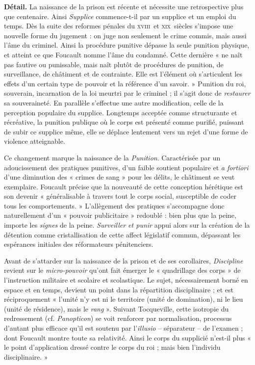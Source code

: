 \documentclass[11pt]{amsart}
\begin{document}
\textbf{Détail.} La naissance de la prison est récente et nécessite une retrospective plus que centenaire. Ainsi \textsl{Supplice} commence-t-il par un supplice et un emploi du temps. Dès la suite des reformes pénales du \textsc{xviii}\ieme \ et \textsc{xix}\ieme \ siècles s'impose une nouvelle forme du jugement : on juge non seulement le crime commis, mais aussi l'âme du criminel. Ainsi la procédure punitive dépasse la seule punition physique, et atteint ce que Foucault nomme l'âme du condamné. Cette dernière « ne naît pas fautive ou punissable, mais naît plutôt de procédures de punition, de surveillance, de châtiment et de contrainte. Elle est l'élément où s'articulent les effets d'un certain type de pouvoir et la référence d'un savoir. » Punition du roi, souverain, incarnation de la loi meurtri par le criminel ; il s'agit donc de \textit{restaurer} sa souveraineté. En parallèle s'effectue une autre modification, celle de la perception populaire du supplice. Longtemps acceptée comme structurante et récréative, la punition publique où le corps est présenté comme purifié, puissant de subir ce supplice même, elle se déplace lentement vers un rejet d'une forme de violence atteignable. 

Ce changement marque la naissance de la \textsl{Punition}. Caractérisée par un adoucissement des pratiques punitives, d'un faible soutient populaire et \textit{a fortiori} d'une diminution des « crimes de sang » pour les délits, le châtiment se veut exemplaire. Foucault précise que la nouveauté de cette conception hérétique est son devenir « généralisable à travers tout le corps social, susceptible de coder tous les comportements. » L'allègement des pratiques s'accompagne donc naturellement d'un « pouvoir publicitaire » redoublé : bien plus que la peine, importe les \textit{signes} de la peine. \textsl{Surveiller et punir} appui alors sur la création de la détention comme cristallisation de cette affect législatif commun, dépassant les espérances initiales des réformateurs pénitenciers. 

Avant de s'attarder sur la naissance de la prison et de ses corollaires, \textsl{Discipline} revient sur le \textit{micro-pouvoir} qu'ont fait émerger le « quadrillage des corps » de l'instruction militaire et scolaire et scolastique. Le sujet, nécessairement borné en espace et en temps, devient un point dans la répartition disciplinaire ; et est réciproquement « l'unité n'y est ni le territoire (unité de domination), ni le lieu (unité de résidence), mais le \textit{rang} ». Suivant Tocqueville, cette isotropie du redressement (cf. \textsl{Panopticon}) se voit renforcer par normalisation, processus d'autant plus efficace qu'il est soutenu par l'\textit{illusio} – séparateur – de l'examen ; dont Foucault montre toute sa relativité. Ainsi le corps du supplicié n'est-il plus « le point d'application dressé contre le corps du roi ; mais bien l'individu disciplinaire. »
\end{document}
